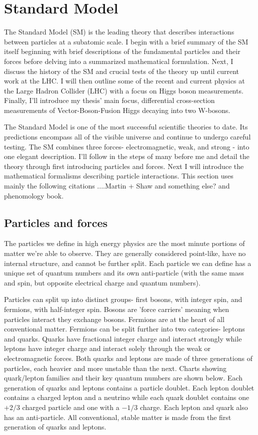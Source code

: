 \section{Standard Model}
The Standard Model (SM) is the leading theory that describes interactions between particles at a subatomic scale. I begin with a brief summary of the SM itself beginning with brief descriptions of the fundamental particles and their forces before delving into a summarized mathematical formulation. Next, I discuss the history of the SM and crucial tests of the theory up until current work at the LHC.  I will then  outline some of the recent and current physics at the Large Hadron Collider (LHC) with a focus on Higgs boson measurements. Finally, I'll introduce my thesis' main focus, differential cross-section measurements of Vector-Boson-Fusion Higgs decaying into two W-bosons.

The Standard Model is one of the most successful scientific theories to date. Its predictions encompass all of the visible universe and continue to undergo careful testing. The SM combines three forces- electromagnetic, weak, and strong - into one elegant description. I'll follow in the steps of many before me and detail the theory through first introducing particles and forces. Next I will introduce the mathematical formalisms describing particle interactions. This section uses mainly the following citations ....Martin + Shaw and something else? and phenomology book. 
\subsection{Particles and forces}
 The particles we define in high energy physics are the most minute portions of matter we're able to observe. They are generally considered point-like, have no internal structure, and cannot be further split. Each particle we can define has a unique set of quantum numbers and its own anti-particle (with the same mass and spin, but opposite electrical charge and quantum numbers).

Particles can split up into distinct groups- first bosons, with integer spin, and fermions, with half-integer spin. Bosons are 'force carriers' meaning when particles interact they exchange bosons. Fermions are at the heart of all conventional matter. Fermions can be split further into two categories- leptons and quarks. Quarks have fractional integer charge and interact strongly while leptons have integer charge and interact solely through the weak or electromagnetic forces. Both quarks and leptons are made of three generations of particles, each heavier and more unstable than the next. Charts showing quark/lepton families and their key quantum numbers are shown below. Each generation of quarks and leptons contains a particle doublet. Each lepton doublet contains a charged lepton and a neutrino while each quark doublet contains one $+2/3$ charged particle and one with a $-1/3$ charge. Each lepton and quark also has an anti-particle. All conventional, stable matter is made from the first generation of quarks and leptons.

